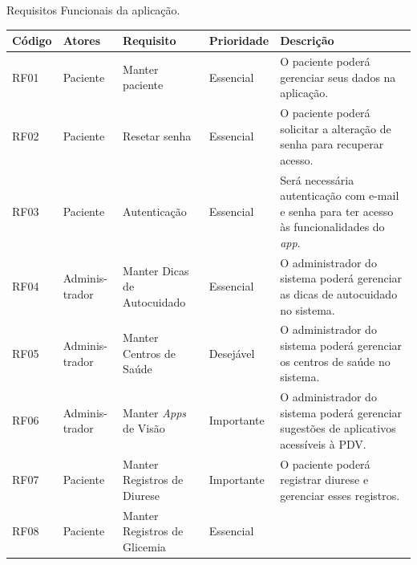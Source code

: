 \begin{quadro}[htb]
    \begin{center}
        \ABNTEXfontereduzida
        \caption{Requisitos Funcionais da aplicação.}
        \label{qua-req-fun}
        \begin{tabular}{|p{1.1cm}|p{1.3cm}|p{3.0cm}|p{1.5cm}|p{6.7cm}|}
            \hline
            \textbf{Código} & \textbf{Atores} & \textbf{Requisito}              & \textbf{Prioridade} & \textbf{Descrição} \\
            \hline
            RF01            & Paciente        & Manter paciente                 & Essencial           &
            O paciente poderá gerenciar seus dados na aplicação.                                                           \\
            \hline
            RF02            & Paciente        & Resetar senha                   & Essencial           &
            O paciente poderá solicitar a alteração de senha para recuperar acesso.                                        \\
            \hline
            RF03            & Paciente        & Autenticação                    & Essencial           &
            Será necessária autenticação com e-mail e senha para ter acesso às funcionalidades do \emph{app}.              \\
            \hline
            RF04            & Adminis-trador  & Manter Dicas de Autocuidado     & Essencial           &
            O administrador do sistema poderá gerenciar as dicas de autocuidado no sistema.                                \\
            \hline
            RF05            & Adminis-trador  & Manter Centros de Saúde         & Desejável           &
            O administrador do sistema poderá gerenciar os centros de saúde no sistema.                                    \\
            \hline
            RF06            & Adminis-trador  & Manter \emph{Apps} de Visão     & Importante          &
            O administrador do sistema poderá gerenciar sugestões de aplicativos acessíveis à PDV\@.                       \\
            \hline
            RF07            & Paciente        & Manter Registros de Diurese     & Importante          &
            O paciente poderá registrar diurese e gerenciar esses registros.                                               \\
            \hline
            RF08            & Paciente        & Manter Registros de Glicemia    & Essencial           &

\end{tabular}
\end{center}
\end{quadro}
